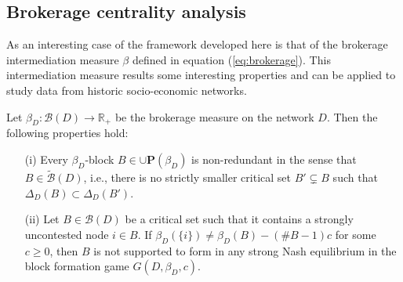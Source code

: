 \subsection{Brokerage centrality analysis}

As an interesting case of the framework developed here is that of the brokerage intermediation measure $\beta$ defined in equation (\ref{eq:brokerage}). This intermediation measure results some interesting properties and can be applied to study data from historic socio-economic networks.
\begin{theorem} \label{thm:beta-block}
Let $\beta_D \colon \mathcal{B} (D) \to \mathbb{R}_+$ be the brokerage measure on the network $D$. Then the following properties hold:
\begin{itemize}
\item[(i)] Every $\beta_D$-block $B \in \cup \mathbf{P} (\beta_D)$ is non-redundant in the sense that $B \in \widetilde{\mathcal{B}} (D)$, i.e., there is no strictly smaller critical set $B' \subsetneq B$ such that $\Delta_D (B) \subset \Delta_D (B')$.

\item[(ii)] Let $B \in \mathcal{B} (D)$ be a critical set such that it contains a strongly uncontested node $i \in B$. If $\beta_D (\{ i \}) \neq \beta_D (B) - (\# B-1) c$ for some $c \geqslant 0$, then $B$ is not supported to form in any strong Nash equilibrium in the block formation game $G (D, \beta_D ,c)$.
\end{itemize}
\end{theorem}
